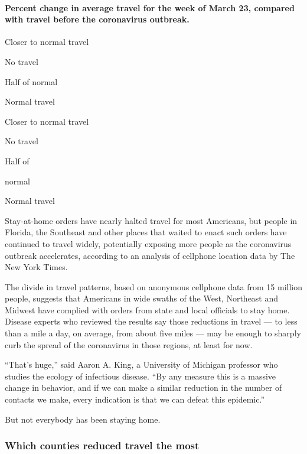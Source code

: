 \hypertarget{percent-change-in-average-travel-for-the-week-of-march-23-compared-with-travel-before-the-coronavirus-outbreak}{%
\paragraph{Percent change in average travel for the week of March 23,
compared with travel before the coronavirus
outbreak.}\label{percent-change-in-average-travel-for-the-week-of-march-23-compared-with-travel-before-the-coronavirus-outbreak}}

Closer to normal travel

No travel

Half of normal

Normal travel

Closer to normal travel

No travel

Half of

normal

Normal travel

Stay-at-home orders have nearly halted travel for most Americans, but
people in Florida, the Southeast and other places that waited to enact
such orders have continued to travel widely, potentially exposing more
people as the coronavirus outbreak accelerates, according to an analysis
of cellphone location data by The New York Times.

The divide in travel patterns, based on anonymous cellphone data from 15
million people, suggests that Americans in wide swaths of the West,
Northeast and Midwest have complied with orders from state and local
officials to stay home. Disease experts who reviewed the results say
those reductions in travel --- to less than a mile a day, on average,
from about five miles --- may be enough to sharply curb the spread of
the coronavirus in those regions, at least for now.

``That's huge,'' said Aaron A. King, a University of Michigan professor
who studies the ecology of infectious disease. ``By any measure this is
a massive change in behavior, and if we can make a similar reduction in
the number of contacts we make, every indication is that we can defeat
this epidemic.''

But not everybody has been staying home.

\hypertarget{which-counties-reduced-travel-the-most}{%
\subsubsection{Which counties reduced travel the
most}\label{which-counties-reduced-travel-the-most}}

